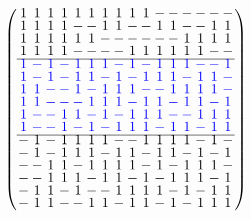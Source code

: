\documentclass{beamer}
\newcommand{\bblue}[1]{\textcolor{blue}{#1}}
\begin{document}
\begin{frame}

  \[
    \arraycolsep=1.0pt\def\arraystretch{0.75}
    \left(
      \begin{array}{cccccccccccccccc}
        1&1&1&1&1&1&1&1&1&1&-&-&-&-&-&-\\
        1&1&1&1&-&-&1&1&-&-&1&1&-&-&1&1\\
        1&1&1&1&1&1&-&-&-&-&-&-&1&1&1&1\\
        1&1&1&1&-&-&-&-&1&1&1&1&1&1&-&-\\ \hline
        \bblue{1}&\bblue{-}&\bblue{1}&\bblue{-}&\bblue{1}&\bblue{1}&\bblue{1}&\bblue{-}&\bblue{1}&\bblue{-}&\bblue{1}&\bblue{1}&\bblue{1}&\bblue{-}&\bblue{-}&\bblue{1}\\
        \bblue{1}&\bblue{-}&\bblue{1}&\bblue{-}&\bblue{1}&\bblue{1}&\bblue{-}&\bblue{1}&\bblue{-}&\bblue{1}&\bblue{1}&\bblue{1}&\bblue{-}&\bblue{1}&\bblue{1}&\bblue{-}\\
        \bblue{1}&\bblue{1}&\bblue{-}&\bblue{-}&\bblue{1}&\bblue{-}&\bblue{1}&\bblue{1}&\bblue{1}&\bblue{-}&\bblue{-}&\bblue{1}&\bblue{1}&\bblue{1}&\bblue{1}&\bblue{-}\\
        \bblue{1}&\bblue{1}&\bblue{-}&\bblue{-}&\bblue{-}&\bblue{1}&\bblue{1}&\bblue{1}&\bblue{-}&\bblue{1}&\bblue{1}&\bblue{-}&\bblue{1}&\bblue{1}&\bblue{-}&\bblue{1}\\
        \bblue{1}&\bblue{-}&\bblue{-}&\bblue{1}&\bblue{1}&\bblue{-}&\bblue{1}&\bblue{-}&\bblue{1}&\bblue{1}&\bblue{1}&\bblue{-}&\bblue{-}&\bblue{1}&\bblue{1}&\bblue{1}\\
        \bblue{1}&\bblue{-}&\bblue{-}&\bblue{1}&\bblue{-}&\bblue{1}&\bblue{-}&\bblue{1}&\bblue{1}&\bblue{1}&\bblue{-}&\bblue{1}&\bblue{1}&\bblue{-}&\bblue{1}&\bblue{1}\\ \hline
        -&1&-&1&1&1&1&-&-&1&1&1&1&-&1&-\\
        -&1&-&1&1&1&-&1&1&-&1&1&-&1&-&1\\
        -&-&1&1&-&1&1&1&1&-&1&-&1&1&1&-\\
        -&-&1&1&1&-&1&1&-&1&-&1&1&1&-&1\\
        -&1&1&-&1&-&-&1&1&1&1&-&1&-&1&1\\
        -&1&1&-&-&1&1&-&1&1&-&1&-&1&1&1\\
      \end{array}
    \right)
  \]
  
\end{frame}
\end{document}
